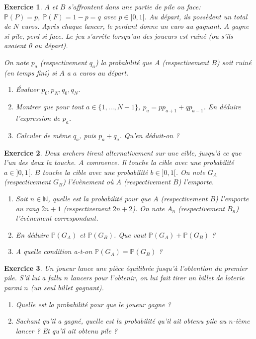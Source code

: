 \documentclass[12pt]{article}
\newtheorem{exercise}{Exercice}[section]
\theoremstyle{remark}
\theoremstyle{remark}
\newcommand{\N}{\mathbb{N}}
\renewcommand{\P}{\mathbb{P}}
\begin{document}
\begin{exercise}
	$A$ et $B$ s'affrontent dans une partie de pile ou face:
	$\P(P)=p,~\P(F)=1-p=q$ avec $p\in]0,1[$. Au départ, ils possèdent un total
	de $N$ euros. Après chaque lancer, le perdant donne un euro au gagnant. $A$
	gagne si pile, perd si face. Le jeu s'arrête lorsqu'un des joueurs est ruiné
	(ou s'ils avaient 0 au départ).

	On note $p_{a}$ (respectivement $q_{a}$) la probabilité que $A$
	(respectivement $B$) soit ruiné (en temps fini) si $A$ a $a$ euros au
	départ.
	\begin{enumerate}
		\item Évaluer $p_{0},p_{N},q_{0},q_{N}$.
		\item Montrer que pour tout $a\in\{1,\dots,N-1\}$,
		$p_{a}=pp_{a+1}+qp_{a-1}$. En déduire l'expression de $p_{a}$.
		\item Calculer de même $q_{a}$, puis $p_{a}+q_{a}$. Qu'en déduit-on ?
	\end{enumerate}
\end{exercise}

\begin{exercise}
	Deux archers tirent alternativement sur une cible, jusqu'à ce que l'un des
	deux la touche. $A$ commence. Il touche la cible avec une probabilité
	$a\in]0,1[$. $B$ touche la cible avec une probabilité $b\in]0,1[$. On note
	$G_{A}$ (respectivement $G_{B}$) l'évènement où $A$ (respectivement $B$)
	l'emporte.
	\begin{enumerate}
		\item Soit $n\in\N$, quelle est la probabilité pour que $A$
		(respectivement $B$) l'emporte au rang $2n+1$ (respectivement $2n+2$).
		On note $A_{n}$ (respectivement $B_{n}$) l'évènement correspondant.
		\item En déduire $\P(G_{A})$ et $\P(G_{B})$. Que vaut
		$\P(G_{A})+\P(G_{B})$ ?
		\item A quelle condition a-t-on $\P(G_{A})=\P(G_{B})$ ?
	\end{enumerate}
\end{exercise}

\begin{exercise}
	Un joueur lance une pièce équilibrée jusqu'à l'obtention du premier pile.
	S'il lui a fallu $n$ lancers pour l'obtenir, on lui fait tirer un billet de
	loterie parmi $n$ (un seul billet gagnant).
	\begin{enumerate}
		\item Quelle est la probabilité pour que le joueur gagne ?
		\item Sachant qu'il a gagné, quelle est la probabilité qu'il ait obtenu
		pile au $n$-ième lancer ? Et qu'il ait obtenu pile ?
	\end{enumerate}
\end{exercise}
\end{document}
